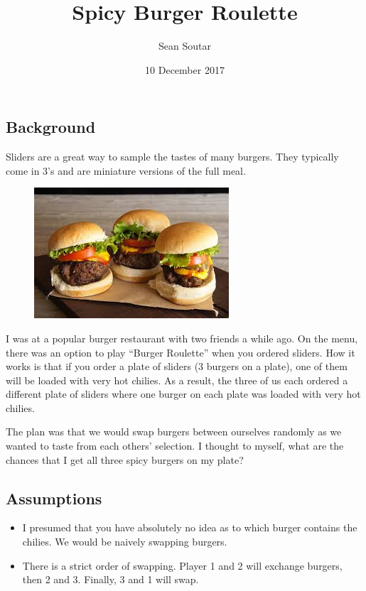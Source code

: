\documentclass[]{article}
\title{Spicy Burger Roulette}
\author{Sean Soutar}
\date{10 December 2017}
\begin{document}
\maketitle

\subsection{Background}\label{background}

Sliders are a great way to sample the tastes of many burgers. They
typically come in 3's and are miniature versions of the full meal.

\begin{figure}
\centering
\includegraphics{resources/sliders_image.jpg}
\caption{}
\end{figure}

I was at a popular burger restaurant with two friends a while ago. On
the menu, there was an option to play ``Burger Roulette'' when you
ordered sliders. How it works is that if you order a plate of sliders (3
burgers on a plate), one of them will be loaded with very hot chilies.
As a result, the three of us each ordered a different plate of sliders
where one burger on each plate was loaded with very hot chilies.

The plan was that we would swap burgers between ourselves randomly as we
wanted to taste from each others' selection. I thought to myself, what
are the chances that I get all three spicy burgers on my plate?

\subsection{Assumptions}\label{assumptions}

\begin{itemize}
\item
  I presumed that you have absolutely no idea as to which burger
  contains the chilies. We would be naively swapping burgers.
\item
  There is a strict order of swapping. Player 1 and 2 will exchange
  burgers, then 2 and 3. Finally, 3 and 1 will swap.
\end{itemize}
\end{document}
